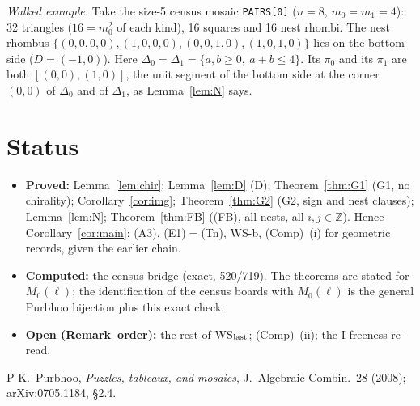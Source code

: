 \documentclass[11pt]{article}
\theoremstyle{definition}\newtheorem{definition}[theorem]{Definition}\newtheorem{remark}[theorem]{Remark}
\newcommand{\Z}{\mathbb Z}\newcommand{\R}{\mathbb R}
\begin{document}
\emph{Walked example.} Take the size-5 census mosaic \texttt{PAIRS[0]} ($n=8$, $m_0=m_1=4$): 32 triangles ($16=m_0^2$ of each kind), 16 squares and 16 nest rhombi. The nest rhombus $\{(0,0,0,0),(1,0,0,0),(0,0,1,0),(1,0,1,0)\}$ lies on the bottom side ($D=(-1,0)$). Here $\Delta_0=\Delta_1=\{a,b\ge0,\ a+b\le4\}$. Its $\pi_0$ and its $\pi_1$ are both $[(0,0),(1,0)]$, the unit segment of the bottom side at the corner $(0,0)$ of $\Delta_0$ and of $\Delta_1$, as Lemma~\ref{lem:N} says.

\section{Status}
\begin{itemize}
\item \textbf{Proved:} Lemma~\ref{lem:chir}; Lemma~\ref{lem:D} (D); Theorem~\ref{thm:G1} (G1, no chirality); Corollary~\ref{cor:img}; Theorem~\ref{thm:G2} (G2, sign and nest clauses); Lemma~\ref{lem:N}; Theorem~\ref{thm:FB} ((FB), all nests, all $i,j\in\Z$). Hence Corollary~\ref{cor:main}: (A3), (E1)$=$(Tn), WS-b, (Comp)~(i) for geometric records, given the earlier chain.
\item \textbf{Computed:} the census bridge (exact, 520/719). The theorems are stated for $M_0(\ell)$; the identification of the census boards with $M_0(\ell)$ is the general Purbhoo bijection plus this exact check.
\item \textbf{Open (Remark~order):} the rest of WS$_{\rm last}$; (Comp)~(ii); the I-freeness re-read.
\end{itemize}
\begin{thebibliography}{P}
 K.~Purbhoo, \emph{Puzzles, tableaux, and mosaics}, J.~Algebraic Combin.\ 28 (2008); arXiv:0705.1184, \S2.4.
\end{thebibliography}
\end{document}
